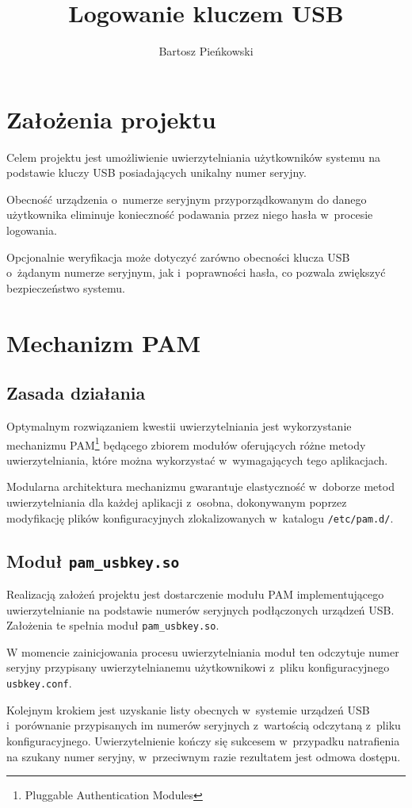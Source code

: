 \documentclass[a4paper,11pt]{article}
\author{Bartosz Pieńkowski}
\title{Logowanie kluczem USB}
\begin{document}
\maketitle

\section{Założenia projektu}
Celem projektu jest umożliwienie uwierzytelniania użytkowników systemu na podstawie kluczy USB posiadających unikalny numer seryjny. 

Obecność urządzenia o~numerze seryjnym przyporządkowanym do danego użytkownika eliminuje konieczność podawania przez niego hasła w~procesie logowania.

Opcjonalnie weryfikacja może dotyczyć zarówno obecności klucza USB o~żądanym numerze seryjnym, jak i~poprawności hasła, co pozwala zwiększyć bezpieczeństwo systemu.


\section{Mechanizm PAM}
\subsection{Zasada działania}
Optymalnym rozwiązaniem kwestii uwierzytelniania jest wykorzystanie mechanizmu PAM\footnote{Pluggable Authentication Modules} będącego zbiorem modułów oferujących różne metody uwierzytelniania, które można wykorzystać w~wymagających tego aplikacjach.

Modularna architektura mechanizmu gwarantuje elastyczność w~doborze metod uwierzytelniania dla każdej aplikacji z~osobna, dokonywanym poprzez modyfikację plików konfiguracyjnych zlokalizowanych w~katalogu \verb|/etc/pam.d/|.


\subsection{Moduł \texttt{pam\_usbkey.so}}
Realizacją założeń projektu jest dostarczenie modułu PAM implementującego uwierzytelnianie na podstawie numerów seryjnych podłączonych urządzeń USB. Założenia te spełnia moduł \verb|pam_usbkey.so|.

W momencie zainicjowania procesu uwierzytelniania moduł ten odczytuje numer seryjny przypisany uwierzytelnianemu użytkownikowi z~pliku konfiguracyjnego \verb|usbkey.conf|.

Kolejnym krokiem jest uzyskanie listy obecnych w~systemie urządzeń USB i~porównanie przypisanych im numerów seryjnych z~wartością odczytaną z~pliku konfiguracyjnego. Uwierzytelnienie kończy się sukcesem w~przypadku natrafienia na szukany numer seryjny, w~przeciwnym razie rezultatem jest odmowa dostępu.
\end{document}
